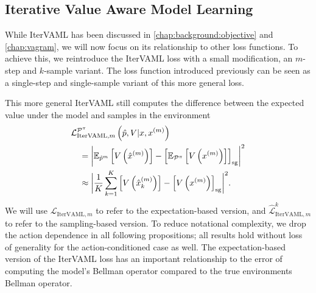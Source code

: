 \subsection{Iterative Value Aware Model Learning}

While IterVAML has been discussed in \autoref{chap:background:objective} and \autoref{chap:vagram}, we will now focus on its relationship to other loss functions.
To achieve this, we reintroduce the IterVAML loss with a small modification, an $m$-step and $k$-sample variant.
The loss function introduced previously can be seen as a single-step and single-sample variant of this more general loss.

This more general IterVAML still computes the difference between the expected value under the model and samples in the environment
\begin{equation}\label{eq:cvaml:itervaml}
\begin{aligned}
     &{\mathcal{L}}^{\mathcal{P}^\pi}_{\mathrm{IterVAML}, m}\left(\hat{p},V|x, x^{(m)}\right) \\
    & \quad = \biggl|\mathbb{E}_{\hat{p}^m} \left[ V\left( \hat{x}^{(m)} \right) \right] - 
    \left[ \mathbb{E}_{\mathcal{P}^\pi}\left[  V\left( x^{(m)} \right) \right] \right]_\mathrm{sg}\biggr|^2 \\
    & \quad \approx \biggl|\frac{1}{K}\sum_{k=1}^K \left[ V\left( \hat{x}_k^{(m)} \right) \right] - 
    \left[ V\left( x^{(m)} \right) \right]_\mathrm{sg}\biggr|^2. 
\end{aligned}
\end{equation}
We will use $\mathcal{L}_{\mathrm{IterVAML}, m}$ to refer to the expectation-based version, and $\hat{\mathcal{L}}^k_{\mathrm{IterVAML}, m}$ to refer to the sampling-based version.
To reduce notational complexity, we drop the action dependence in all following propositions; all results hold without loss of generality for the action-conditioned case as well.
The expectation-based version of the IterVAML loss has an important relationship to the error of computing the model's Bellman operator compared to the true environments Bellman operator.

